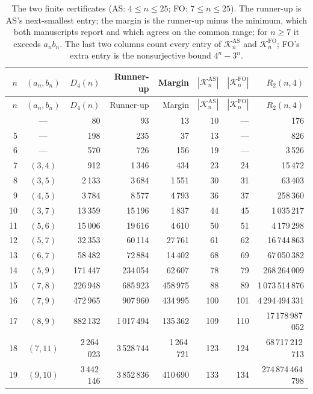 \documentclass[11pt,a4paper]{article}
\numberwithin{equation}{section}
\theoremstyle{definition}
\theoremstyle{remark}
\begin{document}
{\small
\begin{longtable}{@{}rcrrrrrr@{}}
\caption{The two finite certificates (AS: $4\le n\le25$; FO: $7\le n\le25$).
The runner-up is AS's next-smallest entry; the margin is the runner-up minus
the minimum, which both manuscripts report and which agrees on the common
range; for $n\ge7$ it exceeds $a_nb_n$. The last two columns count every
entry of $\mathcal K^{\mathrm{AS}}_n$ and $\mathcal K^{\mathrm{FO}}_n$; FO's
extra entry is the nonsurjective bound $4^n-3^n$.}\label{fo:tab:finite}\\
\toprule
$n$ & $(a_n,b_n)$ & $D_4(n)$ & Runner-up & Margin & $|\mathcal K^{\mathrm{AS}}_n|$ & $|\mathcal K^{\mathrm{FO}}_n|$ & $R_2(n,4)$\\
\midrule\endfirsthead
\toprule
$n$ & $(a_n,b_n)$ & $D_4(n)$ & Runner-up & Margin & $|\mathcal K^{\mathrm{AS}}_n|$ & $|\mathcal K^{\mathrm{FO}}_n|$ & $R_2(n,4)$\\
\midrule\endhead
\bottomrule\endfoot
4 & --- & 80 & 93 & 13 & 10 & --- & 176\\
5 & --- & 198 & 235 & 37 & 13 & --- & 826\\
6 & --- & 570 & 726 & 156 & 19 & --- & 3\,526\\
7 & $(3,4)$ & 912 & 1\,346 & 434 & 23 & 24 & 15\,472\\
8 & $(3,5)$ & 2\,133 & 3\,684 & 1\,551 & 30 & 31 & 63\,403\\
9 & $(4,5)$ & 3\,784 & 8\,577 & 4\,793 & 36 & 37 & 258\,360\\
10 & $(3,7)$ & 13\,359 & 15\,196 & 1\,837 & 44 & 45 & 1\,035\,217\\
11 & $(5,6)$ & 15\,006 & 19\,616 & 4\,610 & 50 & 51 & 4\,179\,298\\
12 & $(5,7)$ & 32\,353 & 60\,114 & 27\,761 & 61 & 62 & 16\,744\,863\\
13 & $(6,7)$ & 58\,482 & 72\,884 & 14\,402 & 68 & 69 & 67\,050\,382\\
14 & $(5,9)$ & 171\,447 & 234\,054 & 62\,607 & 78 & 79 & 268\,264\,009\\
15 & $(7,8)$ & 226\,948 & 685\,923 & 458\,975 & 88 & 89 & 1\,073\,514\,876\\
16 & $(7,9)$ & 472\,965 & 907\,960 & 434\,995 & 100 & 101 & 4\,294\,494\,331\\
17 & $(8,9)$ & 882\,132 & 1\,017\,494 & 135\,362 & 109 & 110 & 17\,178\,987\,052\\
18 & $(7,11)$ & 2\,264\,023 & 3\,528\,744 & 1\,264\,721 & 123 & 124 & 68\,717\,212\,713\\
19 & $(9,10)$ & 3\,442\,146 & 3\,852\,836 & 410\,690 & 133 & 134 & 274\,874\,464\,798\\

\end{longtable}}
\end{document}
